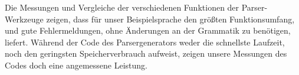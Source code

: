 \begin{kurzfassung}
Die Messungen und Vergleiche der verschiedenen Funktionen der Parser-Werkzeuge zeigen, dass für unser Beispielsprache  den größten Funktionsumfang, und gute Fehlermeldungen, ohne Änderungen an der Grammatik zu benötigen, liefert. Während der Code des Parsergenerators weder die schnellste Laufzeit, noch den geringsten Speicherverbrauch aufweist, zeigen unsere Messungen des Codes doch eine angemessene Leistung.
\end{kurzfassung}
